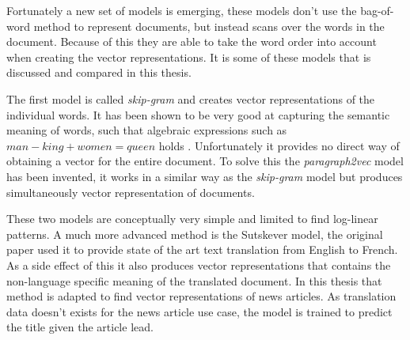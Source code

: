 Fortunately a new set of models is emerging, these models don't use the bag-of-word method to represent documents, but instead scans over the words in the document. Because of this they are able to take the word order into account when creating the vector representations. It is some of these models that is discussed and compared in this thesis.

The first model is called \textit{skip-gram} and creates vector representations of the individual words. It has been shown to be very good at capturing the semantic meaning of words, such that algebraic expressions such as $man - king + women = queen$ holds \cite{word2vec-comparing, word2vec-details}. Unfortunately it provides no direct way of obtaining a vector for the entire document. To solve this the \textit{paragraph2vec} model has been invented, it works in a similar way as the \textit{skip-gram} model but produces simultaneously vector representation of documents.

These two models are conceptually very simple and limited to find log-linear patterns. A much more advanced method is the Sutskever model, the original paper \cite{sutskever} used it to provide state of the art text translation from English to French. As a side effect of this it also produces vector representations that contains the non-language specific meaning of the translated document. In this thesis that method is adapted to find vector representations of news articles. As translation data doesn't exists for the news article use case, the model is trained to predict the title given the article lead.

